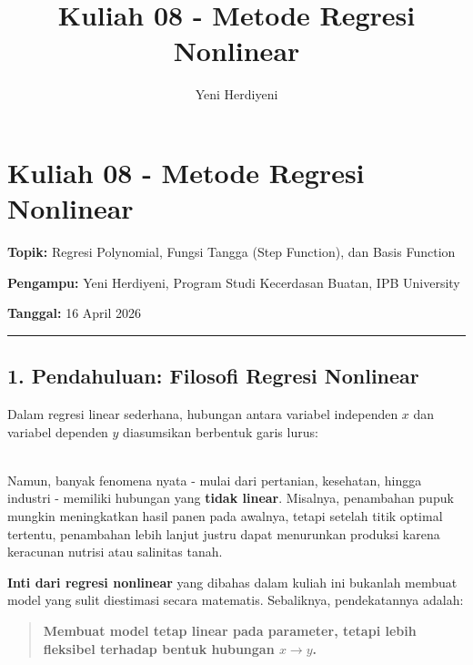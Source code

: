 \documentclass[12pt,a4paper]{article}
\begin{document}
\title{Kuliah 08 - Metode Regresi Nonlinear}
\author{Yeni Herdiyeni}
\date{}
\maketitle

\maketitle
\tableofcontents
\newpage

\section{Kuliah 08 - Metode Regresi Nonlinear}

\textbf{Topik:} Regresi Polynomial, Fungsi Tangga (Step Function), dan Basis Function  

\textbf{Pengampu:} Yeni Herdiyeni, Program Studi Kecerdasan Buatan, IPB University  

\textbf{Tanggal:} 16 April 2026


\hrule


\subsection{1. Pendahuluan: Filosofi Regresi Nonlinear}

Dalam regresi linear sederhana, hubungan antara variabel independen $x$ dan variabel dependen $y$ diasumsikan berbentuk garis lurus:


\\[
\hat{y} = \beta_0 + \beta_1 x
\\]


Namun, banyak fenomena nyata - mulai dari pertanian, kesehatan, hingga industri - memiliki hubungan yang \textbf{tidak linear}. Misalnya, penambahan pupuk mungkin meningkatkan hasil panen pada awalnya, tetapi setelah titik optimal tertentu, penambahan lebih lanjut justru dapat menurunkan produksi karena keracunan nutrisi atau salinitas tanah.


\textbf{Inti dari regresi nonlinear} yang dibahas dalam kuliah ini bukanlah membuat model yang sulit diestimasi secara matematis. Sebaliknya, pendekatannya adalah:


\begin{quote}
\textbf{Membuat model tetap linear pada parameter, tetapi lebih fleksibel terhadap bentuk hubungan $x \rightarrow y$.}\end{quote}
\end{document}

